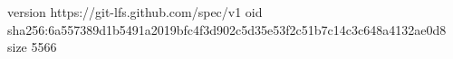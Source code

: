 version https://git-lfs.github.com/spec/v1
oid sha256:6a557389d1b5491a2019bfc4f3d902c5d35e53f2c51b7c14c3c648a4132ae0d8
size 5566

